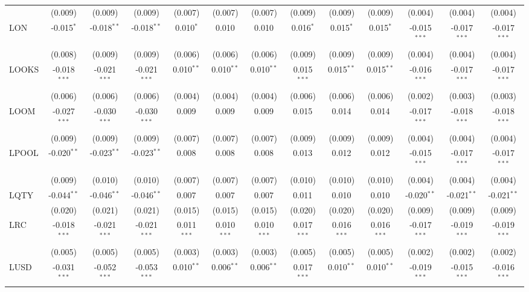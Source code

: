 \begin{table}[!htbp]
\begin{tabular}{@{\extracolsep{5pt}}lcccccccccccc}
  & (0.009) & (0.009) & (0.009) & (0.007) & (0.007) & (0.007) & (0.009) & (0.009) & (0.009) & (0.004) & (0.004) & (0.004) \\
 LON & -0.015$^{*}$ & -0.018$^{**}$ & -0.018$^{**}$ & 0.010$^{*}$ & 0.010$^{}$ & 0.010$^{}$ & 0.016$^{*}$ & 0.015$^{*}$ & 0.015$^{*}$ & -0.015$^{***}$ & -0.017$^{***}$ & -0.017$^{***}$ \\
  & (0.008) & (0.009) & (0.009) & (0.006) & (0.006) & (0.006) & (0.009) & (0.009) & (0.009) & (0.004) & (0.004) & (0.004) \\
 LOOKS & -0.018$^{***}$ & -0.021$^{***}$ & -0.021$^{***}$ & 0.010$^{**}$ & 0.010$^{**}$ & 0.010$^{**}$ & 0.015$^{***}$ & 0.015$^{**}$ & 0.015$^{**}$ & -0.016$^{***}$ & -0.017$^{***}$ & -0.017$^{***}$ \\
  & (0.006) & (0.006) & (0.006) & (0.004) & (0.004) & (0.004) & (0.006) & (0.006) & (0.006) & (0.002) & (0.003) & (0.003) \\
 LOOM & -0.027$^{***}$ & -0.030$^{***}$ & -0.030$^{***}$ & 0.009$^{}$ & 0.009$^{}$ & 0.009$^{}$ & 0.015$^{}$ & 0.014$^{}$ & 0.014$^{}$ & -0.017$^{***}$ & -0.018$^{***}$ & -0.018$^{***}$ \\
  & (0.009) & (0.009) & (0.009) & (0.007) & (0.007) & (0.007) & (0.009) & (0.009) & (0.009) & (0.004) & (0.004) & (0.004) \\
 LPOOL & -0.020$^{**}$ & -0.023$^{**}$ & -0.023$^{**}$ & 0.008$^{}$ & 0.008$^{}$ & 0.008$^{}$ & 0.013$^{}$ & 0.012$^{}$ & 0.012$^{}$ & -0.015$^{***}$ & -0.017$^{***}$ & -0.017$^{***}$ \\
  & (0.009) & (0.010) & (0.010) & (0.007) & (0.007) & (0.007) & (0.010) & (0.010) & (0.010) & (0.004) & (0.004) & (0.004) \\
 LQTY & -0.044$^{**}$ & -0.046$^{**}$ & -0.046$^{**}$ & 0.007$^{}$ & 0.007$^{}$ & 0.007$^{}$ & 0.011$^{}$ & 0.010$^{}$ & 0.010$^{}$ & -0.020$^{**}$ & -0.021$^{**}$ & -0.021$^{**}$ \\
  & (0.020) & (0.021) & (0.021) & (0.015) & (0.015) & (0.015) & (0.020) & (0.020) & (0.020) & (0.009) & (0.009) & (0.009) \\
 LRC & -0.018$^{***}$ & -0.021$^{***}$ & -0.021$^{***}$ & 0.011$^{***}$ & 0.010$^{***}$ & 0.010$^{***}$ & 0.017$^{***}$ & 0.016$^{***}$ & 0.016$^{***}$ & -0.017$^{***}$ & -0.019$^{***}$ & -0.019$^{***}$ \\
  & (0.005) & (0.005) & (0.005) & (0.003) & (0.003) & (0.003) & (0.005) & (0.005) & (0.005) & (0.002) & (0.002) & (0.002) \\
 LUSD & -0.031$^{***}$ & -0.052$^{***}$ & -0.053$^{***}$ & 0.010$^{**}$ & 0.006$^{**}$ & 0.006$^{**}$ & 0.017$^{***}$ & 0.010$^{**}$ & 0.010$^{**}$ & -0.019$^{***}$ & -0.015$^{***}$ & -0.016$^{***}$ \\

\end{tabular}
\end{table}
